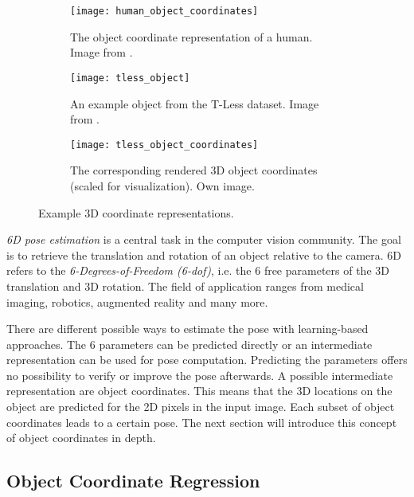 \begin{figure}[!tbp]
	\centering
	\begin{subfigure}[t]{0.29\textwidth}
		\centering
    	\texttt{[image: human\_object\_coordinates]}
    	\caption{The object coordinate representation of a human. Image from \cite{tsharp}.}
    	\label{fig:human_object_coordinates}
	\end{subfigure}
	\hspace{5mm}
	\begin{subfigure}[t]{0.29\textwidth}
		\centering
    	\texttt{[image: tless\_object]}
    	\caption{An example object from the T-Less dataset. Image from \cite{tless}.}
    	\label{fig:tless_object}
	\end{subfigure}
	\hspace{5mm}
	\begin{subfigure}[t]{0.29\textwidth}
		\centering
    	\texttt{[image: tless\_object\_coordinates]}
    	\caption{The corresponding rendered 3D object coordinates (scaled for visualization). Own image.}
    	\label{fig:tless_object_coordinates}
	\end{subfigure}
	\caption{Example 3D coordinate representations.}
\end{figure} 

\textit{6D pose estimation} is a central task in the computer vision community. The goal is to retrieve the translation and rotation of an object relative to the camera. 6D refers to the \textit{6-Degrees-of-Freedom (6-\gls{dof})}, i.e. the 6 free parameters of the 3D translation and 3D rotation. The field of application ranges from medical imaging, robotics, augmented reality and many more.

There are different possible ways to estimate the pose with learning-based approaches. The 6 parameters can be predicted directly or an intermediate representation can be used for pose computation. Predicting the parameters offers no possibility to verify or improve the pose afterwards. A possible intermediate representation are object coordinates. This means that the 3D locations on the object are predicted for the 2D pixels in the input image. Each subset of object coordinates leads to a certain pose. The next section will introduce this concept of object coordinates in depth.

\subsection{Object Coordinate Regression} \label{objectcoordinates}

